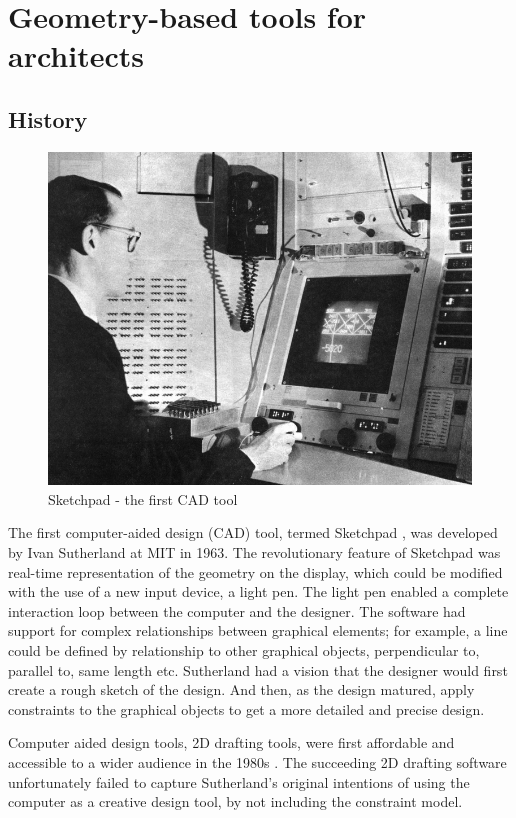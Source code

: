 \section{Geometry-based tools for architects}
\subsection{History}
\begin{figure}
  \includegraphics[width=350pt]{graphics/sketchpad.jpg}
  \caption{Sketchpad - the first CAD tool}
  \label{fig:sketchpad}
\end{figure}
The first computer-aided design (CAD) tool, termed Sketchpad \cite{Aish2005}, was developed by Ivan Sutherland at MIT in 1963. The revolutionary feature of Sketchpad was real-time representation of the geometry on the display, which could be modified with the use of a new input device, a light pen. The light pen enabled a complete interaction loop between the computer and the designer. The software had support for complex relationships between graphical elements; for example, a line could be defined by relationship to other graphical objects, perpendicular to, parallel to, same length etc. Sutherland had a vision that the designer would first create a rough sketch of the design. And then, as the design matured, apply constraints to the graphical objects to get a more detailed and precise design. 

Computer aided design tools, 2D drafting tools, were first affordable and accessible to a wider audience in the 1980s \cite{Aish2005}. The succeeding 2D drafting software unfortunately failed to capture Sutherland’s original intentions of using the computer as a creative design tool, by not including the constraint model. 

